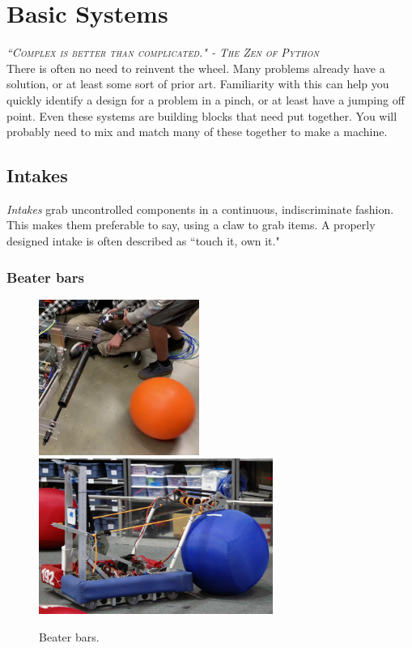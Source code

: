 
\chapter{Basic Systems}

 {\slshape \scshape ``Complex is better than complicated." - The Zen of Python}
 \\
 
 There is often no need to reinvent the wheel. Many problems already have a solution, or at least some sort of prior art. Familiarity with this can help you quickly identify a design for a problem in a pinch, or at least have a jumping off point. Even these systems are building blocks that need put together. You will probably need to mix and match many of these together to make a machine.
 

\section{Intakes} \label{section:intakes}

\textit{Intakes} grab uncontrolled components in a continuous, indiscriminate fashion. This makes them preferable to say, using a claw to grab items. A properly designed intake is often described as ``touch it, own it."

\subsection{Beater bars} 


\begin{figure}[H]
	\includegraphics[height=2in]{imgs/intake_beaterbar_1.png}
	\includegraphics[height=2in]{imgs/intake_beaterbar_2.png}
	\caption{Beater bars.}
\end{figure}

